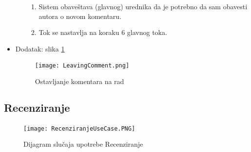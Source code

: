 \documentclass[a4paper]{article}
\begin{document}
\begin{itemize}
\begin{enumerate}
\begin{enumerate}
                \item Sistem obaveštava (glavnog) urednika da je potrebno da sam obavesti autora o novom komentaru.
                \item Tok se nastavlja na koraku 6 glavnog toka.
            \end{enumerate}
        \end{enumerate}
        \item Dodatak: slika \ref{fig:leavingcomment}
        \begin{figure}[ht!]
    \centering
    \texttt{[image: LeavingComment.png]}
    \caption{Ostavljanje komentara na rad}
    \label{fig:leavingcomment}
\end{figure}
\end{itemize}

\vspace{1.5cm}

\newpage

\subsection{Recenziranje}
\label{subsection:recenziranjesec}

\begin{figure}[ht!]
    \centering
    \texttt{[image: RecenziranjeUseCase.PNG]}
    \caption{Dijagram slučaja upotrebe Recenziranje \cite{alex} \cite{vparadigm}}
    \label{fig:recenziranjeusecase}
\end{figure}
\end{document}
